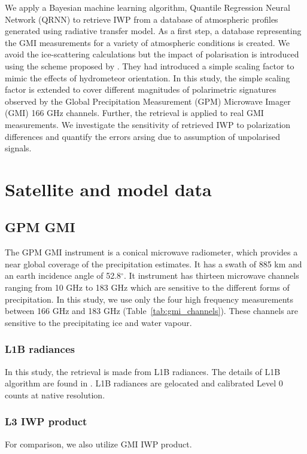 \documentclass[amt, manuscript]{copernicus}
\begin{document}
We apply a Bayesian machine learning algorithm, Quantile Regression Neural Network (QRNN) \citep{pfreundschuh:aneur:18} to retrieve IWP from a database of atmospheric profiles generated using radiative transfer model. As a first step, a database representing the GMI measurements for a variety of atmospheric conditions is created. We avoid the ice-scattering calculations but the impact of polarisation is introduced using the scheme proposed by \citet{barlakas:intro:21}. They had introduced a simple scaling factor to mimic the effects of hydrometeor orientation. In this study, the simple scaling factor is extended to cover different magnitudes of polarimetric signatures observed by the Global Precipitation Measurement (GPM) Microwave Imager (GMI) 166 GHz channels. Further, the retrieval is applied to real GMI measurements. We investigate the sensitivity of retrieved IWP to polarization differences and  quantify the errors arsing due to assumption of unpolarised signals. 

\section{Satellite and model data}

\subsection{GPM GMI}
The GPM GMI instrument is a conical microwave radiometer, which provides a near global coverage of the precipitation estimates. It has a swath of 885\,\,km  and an earth incidence angle of 52.8$^{\circ}$. It instrument has thirteen microwave channels ranging from 10\,\,GHz to 183\,\,GHz which are sensitive to the different forms of precipitation. In this study, we use only the four high frequency measurements between 166 GHz and 183 GHz (Table~\ref{tab:gmi_channels}). These channels are sensitive to the precipitating ice and water vapour.
\subsubsection{L1B radiances}

In this study, the retrieval is made from L1B radiances. The details of L1B algorithm are found in \citet{}. L1B radiances are gelocated and calibrated Level 0 counts at native resolution. 

\subsubsection{L3 IWP product}
For comparison, we also utilize GMI IWP product.  
\end{document}
